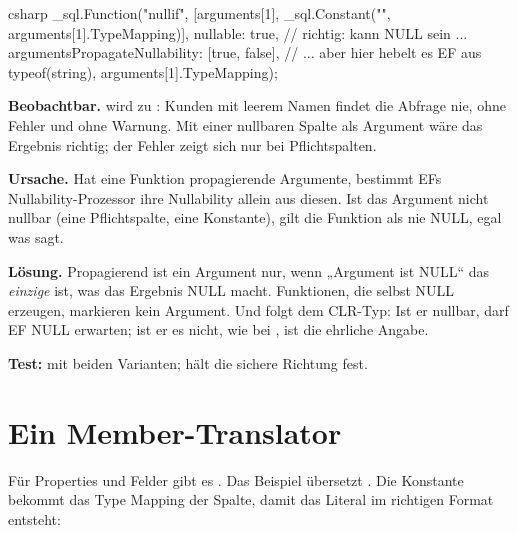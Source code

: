 \begin{sourcecode}{csharp}
_sql.Function("nullif", [arguments[1], _sql.Constant("", arguments[1].TypeMapping)],
    nullable: true,                                   // richtig: kann NULL sein ...
    argumentsPropagateNullability: [true, false],     // ... aber hier hebelt es EF aus
    typeof(string), arguments[1].TypeMapping);
\end{sourcecode}

\begin{failure}
  \textbf{Beobachtbar.}
  wird zu : Kunden mit leerem Namen findet die Abfrage nie, ohne Fehler
  und ohne Warnung. Mit einer nullbaren Spalte als Argument wäre das Ergebnis richtig; der
  Fehler zeigt sich nur bei Pflichtspalten.

  \textbf{Ursache.} Hat eine Funktion propagierende Argumente, bestimmt EFs
  Nullability-Prozessor ihre Nullability allein aus diesen. Ist das Argument nicht nullbar
  (eine Pflichtspalte, eine Konstante), gilt die Funktion als nie NULL, egal was
   sagt.

  \textbf{Lösung.} Propagierend ist ein Argument nur, wenn „Argument ist NULL“ das
  \emph{einzige} ist, was das Ergebnis NULL macht. Funktionen, die selbst NULL erzeugen,
  markieren kein Argument. Und  folgt dem CLR-Typ: Ist er nullbar, darf EF
  NULL erwarten; ist er es nicht, wie bei , ist  die
  ehrliche Angabe.

  \textbf{Test:}
  mit beiden Varianten;
  hält die sichere Richtung fest.
\end{failure}

\section{Ein Member-Translator}

Für Properties und Felder gibt es . Das Beispiel
übersetzt . Die Konstante
bekommt das Type Mapping der Spalte, damit das Literal im richtigen Format entsteht:

